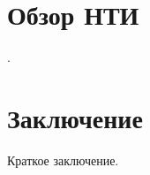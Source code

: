 \documentclass{gostcheck-vkr}
\begin{document}
\section{Обзор НТИ}
\cite{ru01, ru02, ru03, ru04, ru05, ru06, ru07, ru08}.
\section{Заключение}
Краткое заключение.
\end{document}
